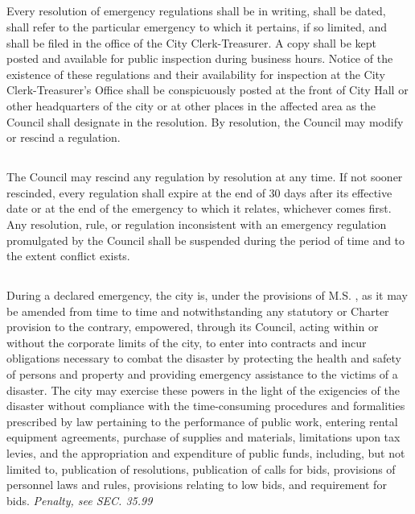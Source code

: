 \documentclass[code.tex]{subfiles}
\begin{document}
\subsection{}
Every resolution of emergency regulations shall be in writing, shall be dated, shall refer to the particular emergency to which it pertains, if so limited, and shall be filed in the office of the City Clerk-Treasurer. A copy shall be kept posted and available for public inspection during business hours. Notice of the existence of these regulations and their availability for inspection at the City Clerk-Treasurer’s Office shall be conspicuously posted at the front of City Hall or other headquarters of the city or at other places in the affected area as the Council shall designate in the resolution. By resolution, the Council may modify or rescind a regulation.
\subsection{}
The Council may rescind any regulation by resolution at any time. If not sooner rescinded, every regulation shall expire at the end of 30 days after its effective date or at the end of the emergency to which it relates, whichever comes first. Any resolution, rule, or regulation inconsistent with an emergency regulation promulgated by the Council shall be suspended during the period of time and to the extent conflict exists.
\subsection{}
During a declared emergency, the city is, under the provisions of M.S. , as it may be amended from time to time and notwithstanding any statutory or Charter provision to the contrary, empowered, through its Council, acting within or without the corporate limits of the city, to enter into contracts and incur obligations necessary to combat the disaster by protecting the health and safety of persons and property and providing emergency assistance to the victims of a disaster. The city may exercise these powers in the light of the exigencies of the disaster without compliance with the time-consuming procedures and formalities prescribed by law pertaining to the performance of public work, entering rental equipment agreements, purchase of supplies and materials, limitations upon tax levies, and the appropriation and expenditure of public funds, including, but not limited to, publication of resolutions, publication of calls for bids, provisions of personnel laws and rules, provisions relating to low bids, and requirement for bids.\newline
\emph{Penalty, see SEC. 35.99}
\end{document}

